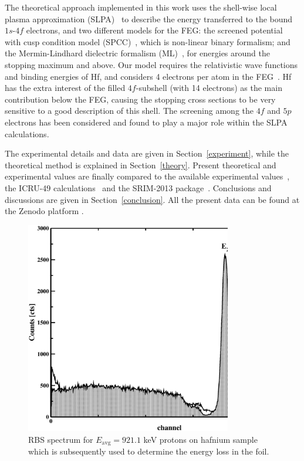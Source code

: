 \documentclass[aps,pra,reprint,groupedaddress,showpacs,showkeys]{revtex4-1}
\begin{document}
The theoretical approach implemented in this work uses the shell-wise 
local plasma approximation (SLPA)~\cite{mon13} to describe the energy 
transferred to the bound $1s$-$4f$ electrons, and two different models 
for the FEG: the screened potential with cusp condition model (SPCC)~\cite{mon17}, 
which is non-linear binary formalism; and the Mermin-Lindhard dielectric 
formalism (ML)~\cite{Mermin}, for energies around the stopping maximum 
and above. Our model requires the relativistic wave functions and 
binding energies of Hf, and considers 4 electrons per atom in the 
FEG~\cite{mendez2019}. Hf has the extra interest of the filled 
$4f$-subshell (with 14 electrons) as the main contribution below the 
FEG, causing the stopping cross sections to be very sensitive to a good 
description of this shell. The screening among the $4f$ and $5p$ 
electrons has been considered and found to play a major role within the 
SLPA calculations.

The experimental details and data are given in Section~\ref{experiment}, 
while the theoretical method is explained in Section~\ref{theory}. 
Present theoretical and experimental values are finally compared to the 
available experimental values~\cite{Sirotinin}, the ICRU-49 
calculations~\cite{ICRU49} and the SRIM-2013 package~\cite{Ziegler01}. 
Conclusions and discussions are given in Section~\ref{conclusion}. All 
the present data can be found at the Zenodo platform \cite{zenodo}.

\begin{figure}[!t]
\centering
\includegraphics[width=9cm]{Fig01.eps}
\caption{RBS spectrum for $E_{\mathrm{avg}}=921.1$ keV protons on 
hafnium sample which is subsequently used to determine the energy loss 
in the foil.}
\label{F01}
\end{figure}
\end{document}
